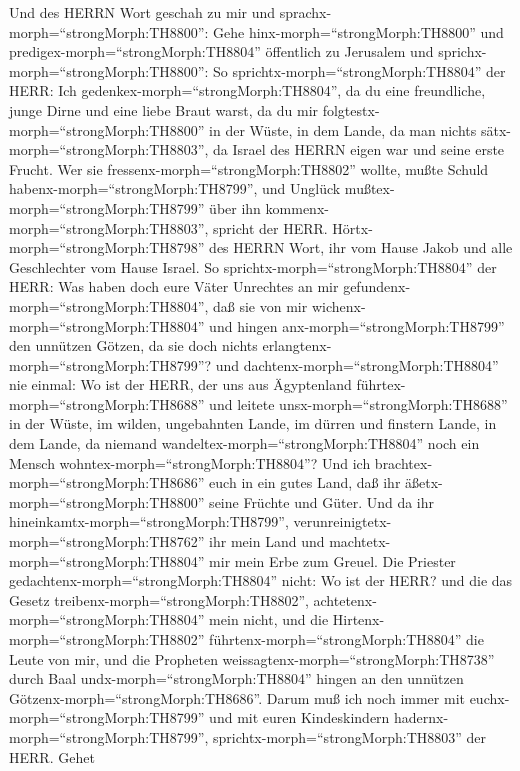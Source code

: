  Und des HERRN Wort geschah zu mir und
sprachx-morph=``strongMorph:TH8800'':  Gehe
hinx-morph=``strongMorph:TH8800'' und
predigex-morph=``strongMorph:TH8804'' öffentlich zu Jerusalem und
sprichx-morph=``strongMorph:TH8800'': So
sprichtx-morph=``strongMorph:TH8804'' der HERR: Ich
gedenkex-morph=``strongMorph:TH8804'', da du eine freundliche, junge
Dirne und eine liebe Braut warst, da du mir
folgtestx-morph=``strongMorph:TH8800'' in der Wüste, in dem Lande, da
man nichts sätx-morph=``strongMorph:TH8803'',  da Israel des
HERRN eigen war und seine erste Frucht. Wer sie
fressenx-morph=``strongMorph:TH8802'' wollte, mußte Schuld
habenx-morph=``strongMorph:TH8799'', und Unglück
mußtex-morph=``strongMorph:TH8799'' über ihn
kommenx-morph=``strongMorph:TH8803'', spricht der HERR. 
Hörtx-morph=``strongMorph:TH8798'' des HERRN Wort, ihr vom Hause Jakob
und alle Geschlechter vom Hause Israel.  So
sprichtx-morph=``strongMorph:TH8804'' der HERR: Was haben doch eure
Väter Unrechtes an mir gefundenx-morph=``strongMorph:TH8804'', daß sie
von mir wichenx-morph=``strongMorph:TH8804'' und hingen
anx-morph=``strongMorph:TH8799'' den unnützen Götzen, da sie doch nichts
erlangtenx-morph=``strongMorph:TH8799''?  und
dachtenx-morph=``strongMorph:TH8804'' nie einmal: Wo ist der HERR, der
uns aus Ägyptenland führtex-morph=``strongMorph:TH8688'' und leitete
unsx-morph=``strongMorph:TH8688'' in der Wüste, im wilden, ungebahnten
Lande, im dürren und finstern Lande, in dem Lande, da niemand
wandeltex-morph=``strongMorph:TH8804'' noch ein Mensch
wohntex-morph=``strongMorph:TH8804''?  Und ich
brachtex-morph=``strongMorph:TH8686'' euch in ein gutes Land, daß ihr
äßetx-morph=``strongMorph:TH8800'' seine Früchte und Güter. Und da ihr
hineinkamtx-morph=``strongMorph:TH8799'',
verunreinigtetx-morph=``strongMorph:TH8762'' ihr mein Land und
machtetx-morph=``strongMorph:TH8804'' mir mein Erbe zum Greuel.
 Die Priester gedachtenx-morph=``strongMorph:TH8804'' nicht:
Wo ist der HERR? und die das Gesetz
treibenx-morph=``strongMorph:TH8802'',
achtetenx-morph=``strongMorph:TH8804'' mein nicht, und die
Hirtenx-morph=``strongMorph:TH8802''
führtenx-morph=``strongMorph:TH8804'' die Leute von mir, und die
Propheten weissagtenx-morph=``strongMorph:TH8738'' durch Baal
undx-morph=``strongMorph:TH8804'' hingen an den unnützen
Götzenx-morph=``strongMorph:TH8686''.  Darum muß ich noch
immer mit euchx-morph=``strongMorph:TH8799'' und mit euren Kindeskindern
hadernx-morph=``strongMorph:TH8799'',
sprichtx-morph=``strongMorph:TH8803'' der HERR.  Gehet
